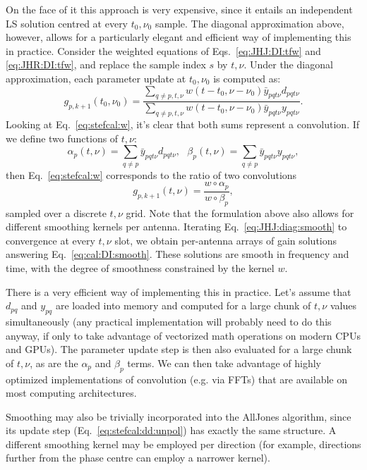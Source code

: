 \documentclass[useAMS,usenatbib]{mn2e}
\numberwithin{equation}{section} %
\begin{document}
On the face of it this approach is very expensive, since it entails an independent LS solution centred at 
every $t_0,\nu_0$ sample. The diagonal approximation above, however, allows for a particularly elegant and efficient way of 
implementing this in practice. Consider the weighted equations of Eqs.~\ref{eq:JHJ:DI:tfw} and \ref{eq:JHR:DI:tfw}, 
and replace the sample index $s$ by $t,\nu$. Under the diagonal approximation, each parameter update at $t_0,\nu_0$ is 
computed as:
\begin{equation}
\label{eq:stefcal:w}
g_{p,{k+1}}(t_0,\nu_0) = \frac{\sum\limits_{q\ne p,t,\nu} w(t-t_0,\nu-\nu_0) \bar{y}_{pqt\nu} d_{pqt\nu} }
{\sum\limits_{q\ne p,t,\nu} w(t-t_0,\nu-\nu_0) \bar{y}_{pqt\nu} y_{pqt\nu}}.
\end{equation}
Looking at Eq.~\ref{eq:stefcal:w}, it's clear that both sums represent a convolution. If we define two functions of $t,\nu$:
\begin{equation}
\alpha_p(t,\nu) = \sum\limits_{q\ne p} \bar{y}_{pqt\nu} d_{pqt\nu},~~~
\beta_p(t,\nu) = \sum\limits_{q\ne p} \bar{y}_{pqt\nu} y_{pqt\nu},
\end{equation}
then Eq.~\ref{eq:stefcal:w} corresponds to the ratio of two convolutions
\begin{equation}
\label{eq:JHJ:diag:smooth}
g_{p,k+1}(t,\nu) = \frac{w\circ \alpha_p}{w\circ\beta_p},
\end{equation}
sampled over a discrete $t,\nu$ grid. Note that the formulation above also allows for different smoothing kernels per antenna.
Iterating Eq.~\ref{eq:JHJ:diag:smooth} to convergence at every $t,\nu$ slot, we obtain per-antenna arrays of gain solutions 
answering Eq.~\ref{eq:cal:DI:smooth}. These solutions are smooth in frequency and time, with the degree of smoothness 
constrained by the kernel $w$. 

There is a very efficient way of implementing this in practice. Let's assume that $d_{pq}$ and $y_{pq}$ are loaded into memory 
and computed for a large chunk of $t,\nu$ values simultaneously (any practical implementation will probably need to do this anyway, 
if only to take advantage of vectorized math operations on modern CPUs and GPUs). The parameter update step is then also evaluated
for a large chunk of $t,\nu$, as are the $\alpha_p$ and $\beta_p$ terms. We can then take advantage of highly optimized 
implementations of convolution (e.g. via FFTs) that are available on most computing architectures. 

Smoothing may also be trivially incorporated into the {\sc AllJones} algorithm, since its update step (Eq.~\ref{eq:stefcal:dd:unpol}) 
has exactly the same structure. A different smoothing kernel may be employed per direction (for example, directions further from 
the phase centre can employ a narrower kernel). 
\end{document}
